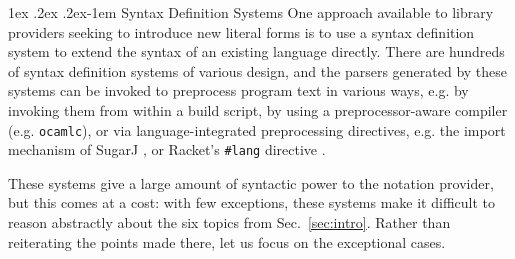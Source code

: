 \documentclass[acmsmall]{acmart}
\makeatletter
\renewcommand{\paragraph}{%
  \@startsection{paragraph}{4}%
  {\z@}{1ex \@plus .2ex \@minus .2ex}{-1em}%
  {\normalfont\normalsize\bfseries}%
}
\newcommand{\li}[1]{\lstinline[basicstyle=\ttfamily\fontsize{9pt}{1em}\selectfont]{#1}}
\makeatother
\begin{document}
\paragraph{Syntax Definition Systems}\label{sec:syntax-dialects-intro}
One approach available to library providers seeking to introduce new literal forms is to use a syntax definition system to extend the syntax of an existing language directly. %
There are hundreds of syntax definition systems of various design, and the parsers generated by these systems can be invoked to preprocess program text in various ways, e.g. by invoking them from within a build script, by using a preprocessor-aware compiler (e.g. \li{ocamlc}), or via language-integrated preprocessing directives, e.g. the import mechanism of SugarJ \cite{erdweg2011sugarj}, or Racket's \li{#lang} directive \cite{Flatt:2012:CLR:2063176.2063195}. %

These systems give a large amount of syntactic power to the notation provider, but this comes at a cost: with few exceptions, these systems make it difficult to reason abstractly about the six topics from Sec.~\ref{sec:intro}. Rather than reiterating the points made there, let us focus on the exceptional cases.
\end{document}
